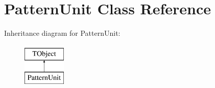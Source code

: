 \hypertarget{class_pattern_unit}{}\section{Pattern\+Unit Class Reference}
\label{class_pattern_unit}
Inheritance diagram for Pattern\+Unit\+:\begin{figure}[H]
\begin{center}
\leavevmode
\includegraphics[height=2.000000cm]{class_pattern_unit}
\end{center}
\end{figure}
